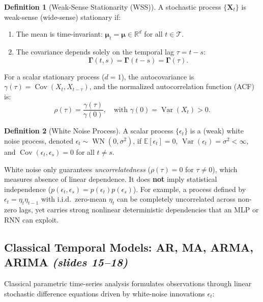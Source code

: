 \documentclass[11pt,a4paper]{article}
\theoremstyle{definition}
\newtheorem{definition}{Definition}[section]
\theoremstyle{plain}
\begin{document}
\begin{definition}[Weak-Sense Stationarity (WSS)]
A stochastic process $\{\mathbf{X}_t\}$ is weak-sense (wide-sense) stationary if:
\begin{enumerate}
    \item The mean is time-invariant: $\boldsymbol{\mu}_t = \boldsymbol{\mu} \in \mathbb{R}^d$ for all $t \in \mathcal{T}$.
    \item The covariance depends solely on the temporal lag $\tau = t - s$:
    \begin{equation}
        \boldsymbol{\Gamma}(t, s) = \boldsymbol{\Gamma}(t - s) = \boldsymbol{\Gamma}(\tau).
    \end{equation}
\end{enumerate}
For a scalar stationary process ($d=1$), the autocovariance is $\gamma(\tau) = \operatorname{Cov}(X_t, X_{t-\tau})$, and the normalized autocorrelation function (ACF) is:
\begin{equation}
    \rho(\tau) = \frac{\gamma(\tau)}{\gamma(0)}, \quad \text{with } \gamma(0) = \operatorname{Var}(X_t) > 0.
\end{equation}
\end{definition}

\begin{definition}[White Noise Process]
A scalar process $\{\epsilon_t\}$ is a (weak) white noise process, denoted $\epsilon_t \sim \operatorname{WN}(0, \sigma^2)$, if $\mathbb{E}[\epsilon_t] = 0$, $\operatorname{Var}(\epsilon_t) = \sigma^2 < \infty$, and $\operatorname{Cov}(\epsilon_t, \epsilon_s) = 0$ for all $t \neq s$.
\end{definition}

\begin{intuitionbox}
White noise only guarantees \emph{uncorrelatedness} ($\rho(\tau) = 0$ for $\tau \neq 0$), which measures absence of linear dependence. It does \textbf{not} imply statistical independence ($p(\epsilon_t, \epsilon_s) = p(\epsilon_t)p(\epsilon_s)$). For example, a process defined by $\epsilon_t = \eta_t \eta_{t-1}$ with i.i.d.\ zero-mean $\eta_t$ can be completely uncorrelated across non-zero lags, yet carries strong nonlinear deterministic dependencies that an MLP or RNN can exploit.
\end{intuitionbox}

\subsection{Classical Temporal Models: AR, MA, ARMA, ARIMA \emph{(slides 15--18)}}
Classical parametric time-series analysis formulates observations through linear stochastic difference equations driven by white-noise innovations $\epsilon_t$:
\end{document}

